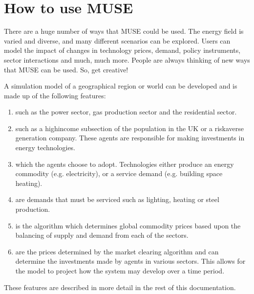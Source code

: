\documentclass[letterpaper,10pt,english]{sphinxmanual}
\begin{document}
\section{How to use MUSE}
\label{\detokenize{overview:how-to-use-muse}}
There are a huge number of ways that MUSE could be used. The energy field is varied and diverse, and many different scenarios can be explored. Users can model the impact of changes in technology prices, demand, policy instruments, sector interactions and much, much more. People are always thinking of new ways that MUSE can be used. So, get creative!

A simulation model of a geographical region or world can be developed and is made up of the following features:
\begin{enumerate}
%
\item {} 
 such as the power sector, gas production sector and the residential sector.

\item {} 
 such as a high\sphinxhyphen{}income subsection of the population in the UK or a risk\sphinxhyphen{}averse generation company. These agents are responsible for making investments in energy technologies.

\item {} 
 which the agents choose to adopt. Technologies either produce an energy commodity (e.g. electricity), or a service demand (e.g. building space heating).

\item {} 
 are demands that must be serviced such as lighting, heating or steel production.

\item {} 
 is the algorithm which determines global commodity prices based upon the balancing of supply and demand from each of the sectors.

\item {} 
 are the prices determined by the market clearing algorithm and can determine the investments made by agents in various sectors. This allows for the model to project how the system may develop over a time period.

\end{enumerate}

These features are described in more detail in the rest of this documentation.
\end{document}

